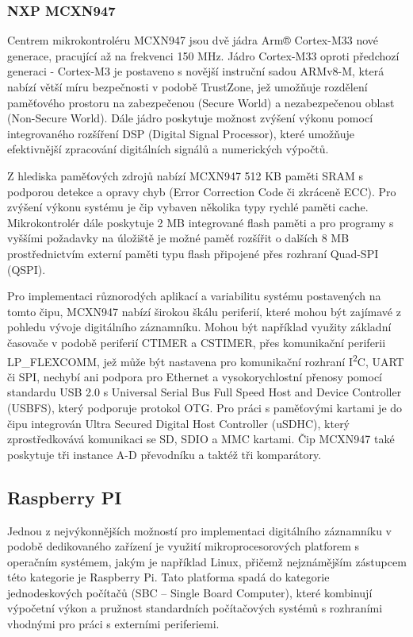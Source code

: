 \subsubsection{NXP MCXN947}
Centrem mikrokontroléru MCXN947 jsou dvě jádra Arm® Cortex-M33 nové generace, pracující až na frekvenci 150 MHz. Jádro Cortex-M33 oproti předchozí generaci - Cortex-M3 je postaveno s novější instruční sadou ARMv8-M, která nabízí větší míru bezpečnosti v podobě TrustZone, jež umožňuje rozdělení paměťového prostoru na zabezpečenou (Secure World) a nezabezpečenou oblast (Non-Secure World). Dále jádro poskytuje možnost zvýšení výkonu pomocí integrovaného rozšíření DSP (Digital Signal Processor), které umožňuje efektivnější zpracování digitálních signálů a numerických výpočtů. \cite{nxp_MCX_Nx4x_Reference_Manual}

Z hlediska paměťových zdrojů nabízí MCXN947 512 KB paměti SRAM s podporou detekce a opravy chyb (Error Correction Code či zkráceně ECC). Pro zvýšení výkonu systému je čip vybaven několika typy rychlé paměti cache. Mikrokontrolér dále poskytuje 2 MB integrované flash paměti a pro programy s vyššími požadavky na úložiště je možné paměť rozšířit o dalších 8 MB prostřednictvím externí paměti typu flash připojené přes rozhraní Quad-SPI (QSPI). \cite{nxp_MCX_Nx4x_Reference_Manual}

Pro implementaci různorodých aplikací a variabilitu systému postavených na tomto čipu, MCXN947 nabízí širokou škálu periferií, které mohou být zajímavé z pohledu vývoje digitálního záznamníku. Mohou být například využity základní časovače v podobě periferií CTIMER a CSTIMER, přes komunikační periferii LP\_FLEXCOMM, jež může být nastavena pro komunikační rozhraní I\textsuperscript{2}C, UART či SPI, nechybí ani podpora pro Ethernet a vysokorychlostní přenosy pomocí standardu USB 2.0 s Universal Serial Bus Full Speed Host and Device Controller (USBFS), který podporuje protokol OTG. Pro práci s paměťovými kartami je do čipu integrován Ultra Secured Digital Host Controller (uSDHC), který zprostředkovává komunikaci se SD, SDIO a MMC kartami. Čip MCXN947 také poskytuje tři instance A-D převodníku a taktéž tři komparátory. \cite{nxp_MCX_Nx4x_Reference_Manual}

\subsection{Raspberry PI}
Jednou z nejvýkonnějších možností pro implementaci digitálního záznamníku v podobě dedikovaného zařízení je využití mikroprocesorových platforem s operačním systémem, jakým je například Linux, přičemž nejznámějším zástupcem této kategorie je Raspberry Pi. Tato platforma spadá do kategorie jednodeskových počítačů (SBC – Single Board Computer), které kombinují výpočetní výkon a pružnost standardních počítačových systémů s rozhraními vhodnými pro práci s externími periferiemi.

